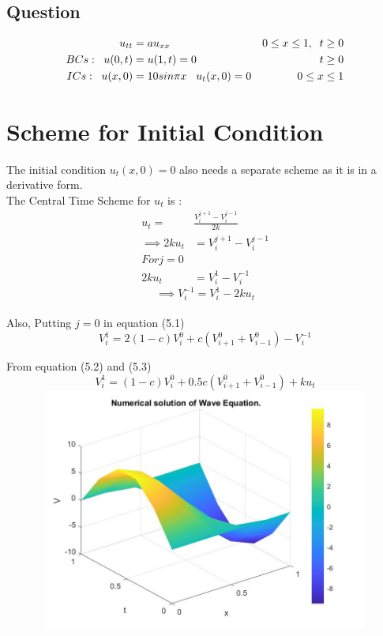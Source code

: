 \subsection{Question}
\begin{align*}
    u_{tt} &= au_{xx}           &   0 \leq x \leq 1, \;\; t\geq 0\\
    BCs:\;\; u(0,t) &= u(1,t)=0   &   t \geq 0\\
    ICs:\;\; u(x,0)  &= 10sin{\pi}x \hspace{3mm} u_t(x,0)=0  &   0 \leq x \leq 1
\end{align*}

\clearpage

\section{Scheme for Initial Condition}
The initial condition \(u_t(x,0)=0\) also needs a separate scheme as it is in a derivative form.\\

The Central Time Scheme for \(u_t\) is :
\begin{align*}
  u_t =& \frac{V_i^{j+1} - V_i^{j-1}}{2k}\\
  \implies 2ku_t &= V_i^{j+1} - V_i^{j-1}\\
  For j=0 \\
  2ku_t &= V_i^1 - V_i^{-1}
\end{align*}
\begin{equation}
 \implies V_i^{-1} = V_i^1 - 2ku_t
\end{equation}
\\

Also, Putting \(j=0\) in equation (5.1)
\begin{equation}
  V_i^1= 2(1-c)V_i^0 +c(V_{i+1}^0+V_{i-1}^0)  - V_i^{-1}
\end{equation}

From equation (5.2) and (5.3)
\begin{equation}
    V_i^1 = (1-c)V_i^0 +0.5c(V_{i+1}^0+V_{i-1}^0)  +ku_t
  \end{equation}
  \vspace{5mm}
  \includegraphics[width=15cm, height=8cm]{wave.jpg}

